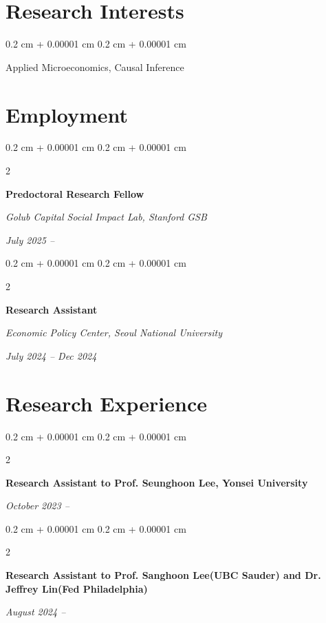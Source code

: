 \documentclass[10pt, letterpaper]{article}
\newenvironment{onecolentry}{
	\begin{adjustwidth}{
			0.2 cm + 0.00001 cm
		}{
			0.2 cm + 0.00001 cm
		}
	}{
	\end{adjustwidth}
} %
\newenvironment{twocolentry}[2][]{
	\onecolentry
	\def\secondColumn{#2}
	\setcolumnwidth{\fill, 4.5 cm}
	\begin{paracol}{2}
	}{
		\switchcolumn \raggedleft \secondColumn
	\end{paracol}
	\endonecolentry
} %
\begin{document}
	
	
	
		\section{Research Interests}
	
	\begin{onecolentry}
Applied Microeconomics, Causal Inference
	\end{onecolentry}
	
	\vspace{12pt}
	
	
	\section{Employment}
	
			\begin{twocolentry}{
			\textit{July 2025 –}    
			
			\textit{}}
		\textbf{Predoctoral Research Fellow}
		
		\textit{Golub Capital Social Impact Lab, Stanford GSB}
	\end{twocolentry}
	
	\vspace{0.20cm}
		\begin{twocolentry}{
			\textit{July 2024 – Dec 2024}    
			
			\textit{}}
		\textbf{Research Assistant}
		
		\textit{Economic Policy Center, Seoul National University}
	\end{twocolentry}
	
	
	
	\vspace{12pt}
	
	\section{Research Experience}
	
			\begin{twocolentry}{
			\textit{October 2023 –}    }
		\textbf{Research Assistant to Prof. Seunghoon Lee, Yonsei University}
		
	\end{twocolentry}
	
\vspace{12pt}
				\begin{twocolentry}{
			\textit{August 2024 –}    
			}
		\textbf{Research Assistant to Prof. Sanghoon Lee(UBC Sauder) and Dr. Jeffrey Lin(Fed Philadelphia)}
		
	\end{twocolentry}
	
\end{document}
